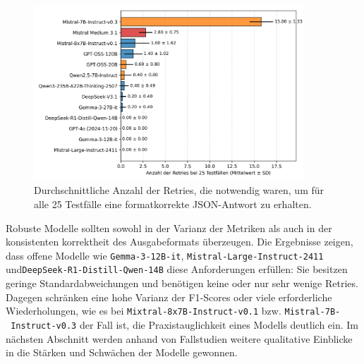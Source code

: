 \begin{figure}[htbp]
    \centering
    \includegraphics[width=0.9\textwidth]{images/results/evaluation_amount_of_retries}
    \caption{Durchschnittliche Anzahl der Retries, die notwendig waren, um für alle 25 Testfälle eine formatkorrekte JSON-Antwort zu erhalten.}
    \label{fig:results_evaluation_amount_of_retries}
\end{figure}

Robuste Modelle sollten sowohl in der Varianz der Metriken als auch in der konsistenten korrektheit des Ausgabeformats überzeugen. Die Ergebnisse zeigen, dass offene Modelle wie \texttt{Gemma-3-12B-it}, \texttt{Mistral-Large-Instruct-2411} und\linebreak\texttt{DeepSeek-R1-Distill-Qwen-14B} diese Anforderungen erfüllen: Sie besitzen geringe Standardabweichungen und benötigen keine oder nur sehr wenige Retries. Dagegen schränken eine hohe Varianz der F1‑Scores oder viele erforderliche Wiederholungen, wie es bei \texttt{Mixtral‑8x7B‑Instruct‑v0.1} bzw. \texttt{Mistral-7B-\linebreak~Instruct-v0.3} der Fall ist, die Praxistauglichkeit eines Modells deutlich ein. Im nächsten Abschnitt werden anhand von Fallstudien weitere qualitative Einblicke in die Stärken und Schwächen der Modelle gewonnen.